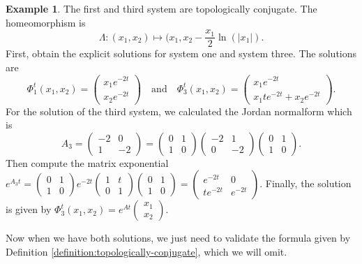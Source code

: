 \documentclass[hidelinks,a4paper, 11pt]{article}
\theoremstyle{plain}
\theoremstyle{break}
\theoremstyle{plain}
\theoremstyle{definition}
\newtheorem*{example}{Example}
\begin{document}
\begin{example}
	The first and third system are topologically conjugate. The homeomorphism is 
	\[
		\Lambda: (x_1,x_2) \mapsto (x_1,x_2 - \frac{x_1}{2}\ln(|x_1|).
	\]
	First, obtain the explicit solutions for system one and system three. The solutions are
	\[
		\Phi^t_1(x_1,x_2) = \begin{pmatrix}x_1e^{-2t}\\ x_2e^{-2t}\end{pmatrix} \quad \text{and} \quad \Phi^t_3(x_1,x_2) = \begin{pmatrix}x_1e^{-2t}\\ x_1te^{-2t} + x_2e^{-2t}\end{pmatrix}.
	\]
	For the solution of the third system, we calculated the Jordan normalform which is 
	\[
		A_3 = \begin{pmatrix}
			-2 & 0 \\ 1 & -2
		\end{pmatrix} = \begin{pmatrix}
		0 & 1 \\ 1 & 0
		\end{pmatrix}
		\begin{pmatrix}
		-2 & 1 \\ 0 & -2
		\end{pmatrix}\begin{pmatrix}
		0 & 1 \\ 1 & 0
		\end{pmatrix}.
	\]
	Then compute the matrix exponential $e^{A_3t} = \begin{pmatrix}
	0 & 1 \\ 1 & 0
	\end{pmatrix}e^{-2t}\begin{pmatrix}
		1 & t \\ 0 & 1
	\end{pmatrix}\begin{pmatrix}
	0 & 1 \\ 1 & 0
	\end{pmatrix} = \begin{pmatrix}
		e^{-2t} & 0 \\ te^{-2t} & e^{-2t}
	\end{pmatrix}$. Finally, the solution is given by $\Phi^t_3(x_1,x_2) = e^{At}\begin{pmatrix}
		x_1 \\ x_2
	\end{pmatrix}$.
	
	Now when we have both solutions, we just need to validate the formula given by Definition \ref{definition:topologically-conjugate}, which we will omit.
\end{example}
\end{document}
